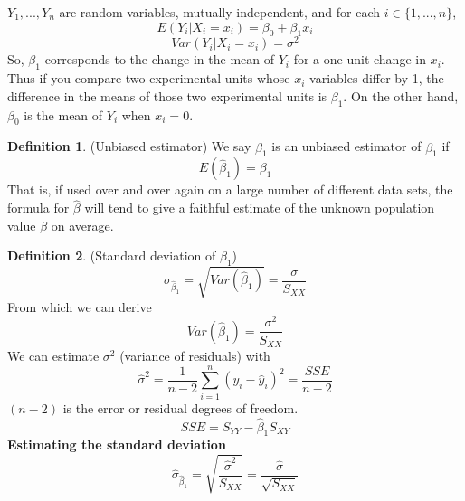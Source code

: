 \documentclass[12pt]{article}
\theoremstyle{definition}
\newtheorem{definition}{Definition}[section]
\theoremstyle{remark}
\begin{document}
\begin{note}
    $Y_1, . . . , Y_n$ are random variables, mutually independent, and for each $i \in \{1,...,n\}$, 
    \begin{equation}
        E(Y_i|X_i=x_i)=\beta_0 +\beta_1x_i
    \end{equation}
    \begin{equation}
        Var(Y_i|X_i=x_i)=\sigma^2
    \end{equation}
    So, $\beta_1$ corresponds to the change in the mean of $Y_i$ for a one unit change in $x_i$.
    Thus if you compare two experimental units whose $x_i$ variables differ by 1, the difference 
    in the means of those two experimental units is $\beta_1$. On the other hand, $\beta_0$ is the mean of
    $Y_i$ when $x_i=0$.
\end{note}

\begin{definition}(Unbiased estimator)
    We say $\hat{\beta}_1$ is an unbiased estimator of $\beta_1$ if 
    \begin{equation}
        E(\hat{\beta}_1)=\beta_1
    \end{equation}
    That is, if used over and over again on a large number of different data sets, 
    the formula for $\hat{\beta}$ will tend to give a faithful estimate of the 
    unknown population value $\beta$ on average.
\end{definition}
\begin{definition}(Standard deviation of $\beta_1$)
    \begin{equation}
        \sigma_{\hat{\beta}_1}=\sqrt{Var(\hat{\beta}_1)}=\frac{\sigma}{S_{XX}}
    \end{equation}
    From which we can derive
    \begin{equation}
        Var(\hat{\beta}_1)=\frac{\sigma^2}{S_{XX}}
    \end{equation}
    We can estimate $\sigma^2$ (variance of residuals) with
    \begin{equation}
        \hat{\sigma}^2=\frac{1}{n-2}\displaystyle\sum_{i=1}^{n}(y_i-\hat{y}_i)^2=\frac{SSE}{n-2}
    \end{equation}
    $(n - 2)$ is the error or residual degrees of freedom.
    \begin{equation}
        SSE=S_{YY}-\hat{\beta}_1S_{XY}
    \end{equation}
    \textbf{Estimating the standard deviation}
    \begin{equation}
        \hat{\sigma}_{\hat{\beta}_1}=\sqrt{\frac{\hat{\sigma}^2}{S_{XX}}}=\frac{\hat{\sigma}}{\sqrt{S_{XX}}}
    \end{equation}
\end{definition}
\end{document}
